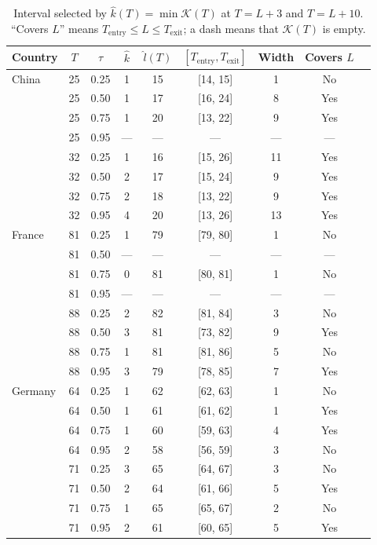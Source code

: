 \documentclass[12pt,a4paper]{article}
\begin{document}
\begin{table}[htbp]
	\centering
	\small
	\caption{Interval selected by $\hat k(T)=\min\mathcal K(T)$ at
		$T=L+3$ and $T=L+10$. ``Covers $L$'' means
		$T_{\mathrm{entry}}\le L\le T_{\mathrm{exit}}$; a dash means that
		$\mathcal K(T)$ is empty.}
	\label{tab:real_data_minK}
	\begin{tabular}{lcccccccc}
		\toprule
		Country & $T$ & $\tau$ & $\hat k$ & $\widehat l(T)$
		& $[T_{\mathrm{entry}},T_{\mathrm{exit}}]$ & Width & Covers $L$ \\
		\midrule
		China & 25 & 0.25 & 1 & 15 & [14, 15] & 1 & No \\
		& 25 & 0.50 & 1 & 17 & [16, 24] & 8 & Yes \\
		& 25 & 0.75 & 1 & 20 & [13, 22] & 9 & Yes \\
		& 25 & 0.95 & --- & --- & --- & --- & --- \\
		& 32 & 0.25 & 1 & 16 & [15, 26] & 11 & Yes \\
		& 32 & 0.50 & 2 & 17 & [15, 24] & 9 & Yes \\
		& 32 & 0.75 & 2 & 18 & [13, 22] & 9 & Yes \\
		& 32 & 0.95 & 4 & 20 & [13, 26] & 13 & Yes \\
		\midrule
		France & 81 & 0.25 & 1 & 79 & [79, 80] & 1 & No \\
		& 81 & 0.50 & --- & --- & --- & --- & --- \\
		& 81 & 0.75 & 0 & 81 & [80, 81] & 1 & No \\
		& 81 & 0.95 & --- & --- & --- & --- & --- \\
		& 88 & 0.25 & 2 & 82 & [81, 84] & 3 & No \\
		& 88 & 0.50 & 3 & 81 & [73, 82] & 9 & Yes \\
		& 88 & 0.75 & 1 & 81 & [81, 86] & 5 & No \\
		& 88 & 0.95 & 3 & 79 & [78, 85] & 7 & Yes \\
		\midrule
		Germany & 64 & 0.25 & 1 & 62 & [62, 63] & 1 & No \\
		& 64 & 0.50 & 1 & 61 & [61, 62] & 1 & Yes \\
		& 64 & 0.75 & 1 & 60 & [59, 63] & 4 & Yes \\
		& 64 & 0.95 & 2 & 58 & [56, 59] & 3 & No \\
		& 71 & 0.25 & 3 & 65 & [64, 67] & 3 & No \\
		& 71 & 0.50 & 2 & 64 & [61, 66] & 5 & Yes \\
		& 71 & 0.75 & 1 & 65 & [65, 67] & 2 & No \\
		& 71 & 0.95 & 2 & 61 & [60, 65] & 5 & Yes \\
		\bottomrule
	\end{tabular}
\end{table}
\end{document}

